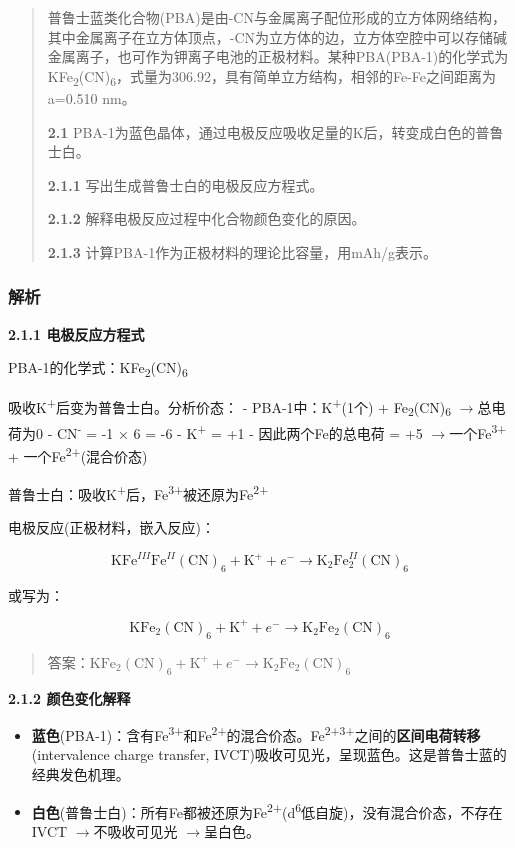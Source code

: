 \documentclass[a4paper,11pt]{ctexart}
\providecommand{\tightlist}{\setlength{\itemsep}{0pt}\setlength{\parskip}{0pt}}
\newcommand{\箭}{\ensuremath{\rightarrow}}
\newcommand{\左箭}{\ensuremath{\leftarrow}}
\newcommand{\上箭}{\ensuremath{\uparrow}}
\newcommand{\下箭}{\ensuremath{\downarrow}}
\newcommand{\衡}{\ensuremath{\rightleftharpoons}}
\newcommand{\双箭}{\ensuremath{\leftrightarrow}}
\newcommand{\约等于}{\ensuremath{\approx}}
\newcommand{\小于等于}{\ensuremath{\leq}}
\newcommand{\大于等于}{\ensuremath{\geq}}
\newcommand{\不等于}{\ensuremath{\neq}}
\newcommand{\西格马}{\ensuremath{\sigma}}
\newcommand{\派}{\ensuremath{\pi}}
\begin{document}
\begin{quote}
普鲁士蓝类化合物(PBA)是由-CN与金属离子配位形成的立方体网络结构，其中金属离子在立方体顶点，-CN为立方体的边，立方体空腔中可以存储碱金属离子，也可作为钾离子电池的正极材料。某种PBA(PBA-1)的化学式为KFe\textsubscript{2}(CN)\textsubscript{6}，式量为306.92，具有简单立方结构，相邻的Fe-Fe之间距离为a=0.510 nm。

\textbf{2.1} PBA-1为蓝色晶体，通过电极反应吸收足量的K后，转变成白色的普鲁士白。

\textbf{2.1.1} 写出生成普鲁士白的电极反应方程式。

\textbf{2.1.2} 解释电极反应过程中化合物颜色变化的原因。

\textbf{2.1.3} 计算PBA-1作为正极材料的理论比容量，用mAh/g表示。
\end{quote}

\subsubsection{解析}\label{ux89e3ux6790-13}

\textbf{2.1.1 电极反应方程式}

PBA-1的化学式：KFe\textsubscript{2}(CN)\textsubscript{6}

吸收K\textsuperscript{+}后变为普鲁士白。分析价态：
- PBA-1中：K\textsuperscript{+}(1个) + Fe\textsubscript{2}(CN)\textsubscript{6} \箭 总电荷为0
- CN\textsuperscript{-} = -1 × 6 = -6
- K\textsuperscript{+} = +1
- 因此两个Fe的总电荷 = +5 \箭 一个Fe\textsuperscript{3+} + 一个Fe\textsuperscript{2+}(混合价态)

普鲁士白：吸收K\textsuperscript{+}后，Fe\textsuperscript{3+}被还原为Fe\textsuperscript{2+}

电极反应(正极材料，嵌入反应)：

\[\text{KFe}^{III}\text{Fe}^{II}(\text{CN})_6 + \text{K}^+ + e^- \rightarrow \text{K}_2\text{Fe}^{II}_2(\text{CN})_6\]

或写为：

\[\text{KFe}_2(\text{CN})_6 + \text{K}^+ + e^- \rightarrow \text{K}_2\text{Fe}_2(\text{CN})_6\]

\begin{quote}
答案：\(\text{KFe}_2(\text{CN})_6 + \text{K}^+ + e^- \rightarrow \text{K}_2\text{Fe}_2(\text{CN})_6\)
\end{quote}

\textbf{2.1.2 颜色变化解释}

\begin{itemize}
\tightlist
\item
  \textbf{蓝色}(PBA-1)：含有Fe\textsuperscript{3+}和Fe\textsuperscript{2+}的混合价态。Fe\textsuperscript{2+}\textsuperscript{3+}之间的\textbf{区间电荷转移}(intervalence charge transfer, IVCT)吸收可见光，呈现蓝色。这是普鲁士蓝的经典发色机理。
\item
  \textbf{白色}(普鲁士白)：所有Fe都被还原为Fe\textsuperscript{2+}(d\textsuperscript{6}低自旋)，没有混合价态，不存在IVCT \箭 不吸收可见光 \箭 呈白色。
\end{itemize}
\end{document}
